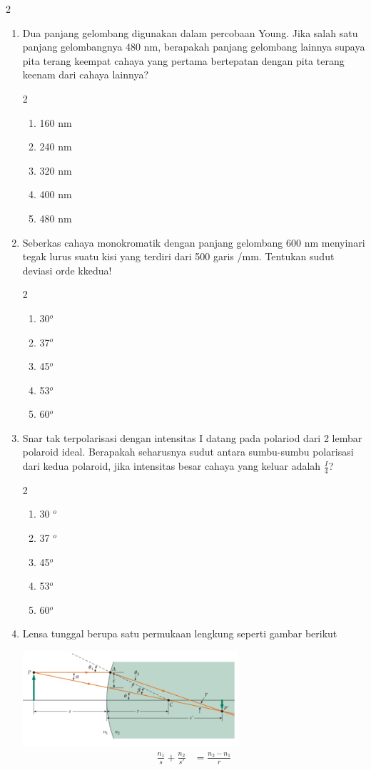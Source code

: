 \documentclass[11pt,a4paper]{extarticle}
\newcommand{\pilgani}[1]{                            \vspace{-0.3cm}\begin{multicols}{2}
 \begin{enumerate}[label=\Alph*., itemsep=0pt,topsep=0pt,leftmargin=*,align=Center]#1                     \end{enumerate}
 \phantom{ini cuma sapi, wedus, dan ayam}
 \end{multicols}}
\begin{document}
\begin{multicols*}{2}
\begin{enumerate}
\vspace{3cm} \item Dua panjang gelombang digunakan dalam percobaan Young. Jika salah satu panjang gelombangnya 480 nm, berapakah panjang gelombang lainnya supaya pita terang keempat cahaya yang pertama bertepatan dengan pita terang keenam dari cahaya lainnya?  \pilgani{
        \item 160 nm
        \item 240 nm
        \item 320 nm
       \item 400 nm
        \item 480 nm



} \vspace{3cm} \item Seberkas cahaya monokromatik dengan panjang gelombang 600 nm menyinari tegak lurus suatu kisi yang terdiri dari 500 garis /mm. Tentukan sudut deviasi orde kkedua!  \pilgani{ \item 30$^o$
        \item 37$^o$
        \item 45$^o$
        \item 53$^o$
        \item 60$^o$
        }

\vspace{3cm}

\item Snar tak terpolarisasi dengan intensitas I datang pada polariod dari 2 lembar polaroid ideal. Berapakah seharusnya sudut antara sumbu-sumbu polarisasi dari kedua polaroid, jika intensitas besar cahaya yang keluar adalah $\frac{I}{4}$?
\pilgani{
        \item 30 $^o$
        \item 37 $^o$
        \item 45$^o$
        \item 53$^o$
        \item 60$^o$
        }
\vspace{3cm}


\item Lensa tunggal berupa satu permukaan lengkung seperti gambar berikut

\graphicspath{ {pic/} }
\includegraphics[width=8cm]{rumuslensasingle}
\begin{align*}
\frac{n_1}{s}+\frac{n_2}{s'}&=\frac{n_2-n_1}{r}
\end{align*}


\end{enumerate}
\end{multicols*}
\end{document}
